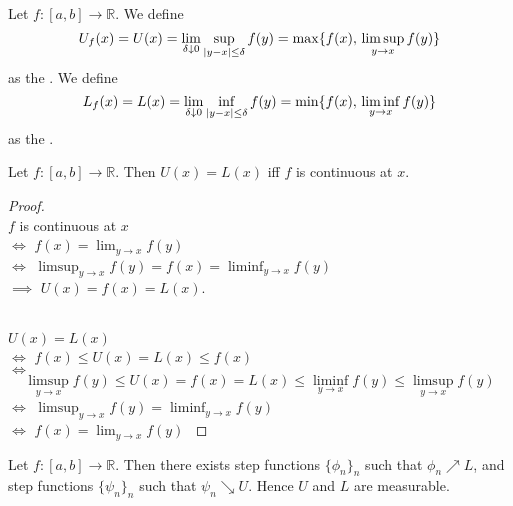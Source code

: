 \documentclass[notoc,notitlepage]{tufte-book}
\begin{document}
\begin{defn}\label{defn:upper_and_lower_envelopes_of_a_function}
  Let $f : [a, b] \to \mathbb{R}$.
  We define
  \begin{equation*}
    U_f(x) = U(x)
           = \lim_{\delta \downarrow 0} \sup_{\left|y - x\right| \leq \delta} f(y)
           = \max \{ f(x),\, \limsup_{y \to x} f(y) \}
  \end{equation*}
  as the .
  We define
  \begin{equation*}
    L_f(x) = L(x)
           = \lim_{\delta \downarrow 0} \inf_{\left|y - x\right| \leq \delta} f(y)
           = \min \{ f(x),\, \liminf_{y \to x} f(y) \}
  \end{equation*}
  as the .
\end{defn}

\begin{propo}\label{propo:characterization_of_continuity_with_upper_and_lower_envelopes}
  Let $f : [a, b] \to \mathbb{R}$. Then
  $U(x) = L(x)$ iff $f$ is continuous at $x$.
\end{propo}

\begin{proof}
  \hlbnoted{$(\impliedby)$} \\
  {\parindent0pt
  $f$ is continuous at $x$ \\
  $\iff$ $f(x) = \lim_{y \to x} f(y)$ \\
  $\iff$ $\limsup_{y \to x} f(y) = f(x) = \liminf_{y \to x} f(y)$ \\
  $\implies$ $U(x) = f(x) = L(x)$.
  }

  \noindent
  \hlbnoted{$(\implies)$} \\
  {\parindent0pt
  $U(x) = L(x)$ \\
  $\iff$ $f(x) \leq U(x) = L(x) \leq f(x)$ \\
  $\iff$
  \begin{equation*}
  \limsup\limits_{y \to x} f(y) \leq U(x)
    = f(x) = L(x) \leq \liminf\limits_{y \to x} f(y)
    \leq \limsup\limits_{y \to x} f(y)
  \end{equation*}
  $\iff$ $\limsup_{y \to x} f(y) = \liminf_{y \to x} f(y)$ \\
  $\iff$ $f(x) = \lim_{y \to x} f(y)$
  }
\end{proof}

\begin{propo}\label{propo:monotonic_sequence_of_step_functions_to_the_upper_and_lower_envelopes}
  Let $f : [a, b] \to \mathbb{R}$.
  Then there exists step functions $\{ \phi_n \}_n$
  such that $\phi_n \nearrow L$, and step functions $\{ \psi_n \}_n$
  such that $\psi_n \searrow U$.
  Hence $U$ and $L$ are measurable.
\end{propo}
\end{document}
